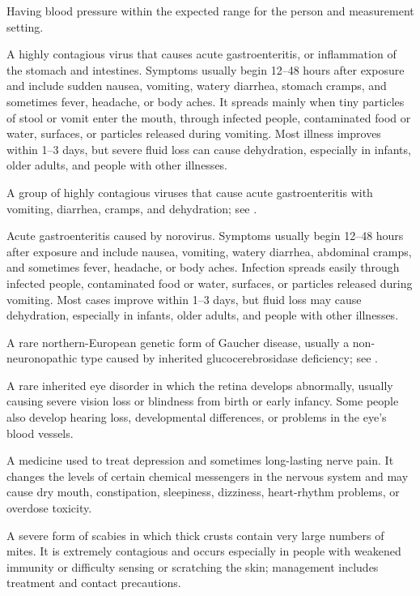  Having blood pressure within the expected range for the person and measurement setting.

 A highly contagious virus that causes acute gastroenteritis, or inflammation of the stomach and intestines. Symptoms usually begin 12--48 hours after exposure and include sudden nausea, vomiting, watery diarrhea, stomach cramps, and sometimes fever, headache, or body aches. It spreads mainly when tiny particles of stool or vomit enter the mouth, through infected people, contaminated food or water, surfaces, or particles released during vomiting. Most illness improves within 1--3 days, but severe fluid loss can cause dehydration, especially in infants, older adults, and people with other illnesses.

 A group of highly contagious viruses that cause acute gastroenteritis with vomiting, diarrhea, cramps, and dehydration; see .

 Acute gastroenteritis caused by norovirus. Symptoms usually begin 12--48 hours after exposure and include nausea, vomiting, watery diarrhea, abdominal cramps, and sometimes fever, headache, or body aches. Infection spreads easily through infected people, contaminated food or water, surfaces, or particles released during vomiting. Most cases improve within 1--3 days, but fluid loss may cause dehydration, especially in infants, older adults, and people with other illnesses.

 A rare northern-European genetic form of Gaucher disease, usually a non-neuronopathic type caused by inherited glucocerebrosidase deficiency; see .

 A rare inherited eye disorder in which the retina develops abnormally, usually causing severe vision loss or blindness from birth or early infancy. Some people also develop hearing loss, developmental differences, or problems in the eye’s blood vessels.

 A medicine used to treat depression and sometimes long-lasting nerve pain. It changes the levels of certain chemical messengers in the nervous system and may cause dry mouth, constipation, sleepiness, dizziness, heart-rhythm problems, or overdose toxicity.

 A severe form of scabies in which thick crusts contain very large numbers of mites. It is extremely contagious and occurs especially in people with weakened immunity or difficulty sensing or scratching the skin; management includes treatment and contact precautions.

